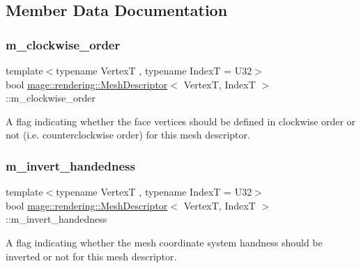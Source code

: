 \subsection{Member Data Documentation}
\hypertarget{classmage_1_1rendering_1_1_mesh_descriptor_a24ad440002ac7a4db6f0cb642ae1477d}{}\label{classmage_1_1rendering_1_1_mesh_descriptor_a24ad440002ac7a4db6f0cb642ae1477d} 
\subsubsection{\texorpdfstring{m\+\_\+clockwise\+\_\+order}{m\_clockwise\_order}}
{\footnotesize\ttfamily template$<$typename VertexT , typename IndexT  = U32$>$ \\
bool \hyperlink{classmage_1_1rendering_1_1_mesh_descriptor}{mage\+::rendering\+::\+Mesh\+Descriptor}$<$ VertexT, IndexT $>$\+::m\+\_\+clockwise\+\_\+order\hspace{0.3cm}{\ttfamily [private]}}

A flag indicating whether the face vertices should be defined in clockwise order or not (i.\+e. counterclockwise order) for this mesh descriptor. \hypertarget{classmage_1_1rendering_1_1_mesh_descriptor_a61d5b541414f827f43ec835c7f2da462}{}\label{classmage_1_1rendering_1_1_mesh_descriptor_a61d5b541414f827f43ec835c7f2da462} 
\subsubsection{\texorpdfstring{m\+\_\+invert\+\_\+handedness}{m\_invert\_handedness}}
{\footnotesize\ttfamily template$<$typename VertexT , typename IndexT  = U32$>$ \\
bool \hyperlink{classmage_1_1rendering_1_1_mesh_descriptor}{mage\+::rendering\+::\+Mesh\+Descriptor}$<$ VertexT, IndexT $>$\+::m\+\_\+invert\+\_\+handedness\hspace{0.3cm}{\ttfamily [private]}}

A flag indicating whether the mesh coordinate system handness should be inverted or not for this mesh descriptor. 